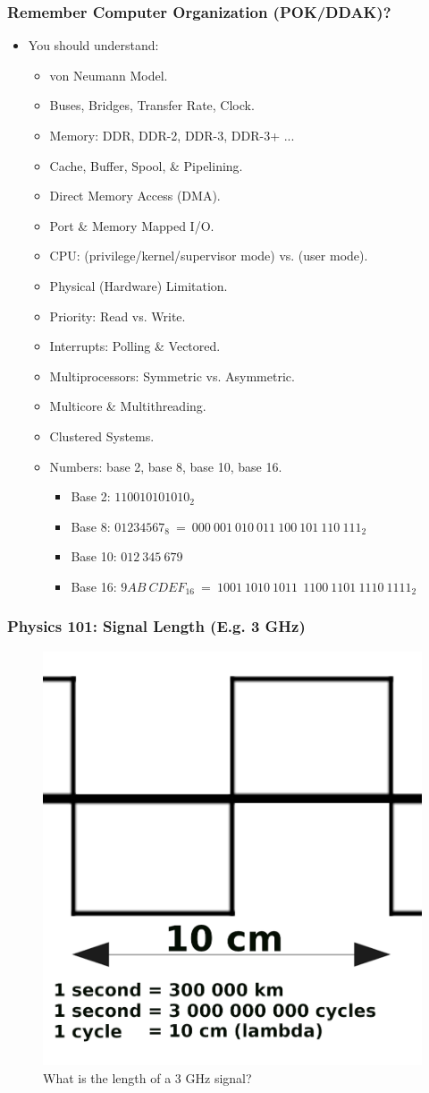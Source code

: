 \documentclass[aspectratio=169, xcolor=table, notheorems, hyperref={pdfpagelabels=false}]{beamer}
\begin{document}
\begin{frame}
\frametitle{Remember Computer Organization (POK/DDAK)?}
\begin{itemize}
\item You should understand:
\begin{itemize}
\item von Neumann Model.
\item Buses, Bridges, Transfer Rate, Clock.
\item Memory: DDR, DDR-2, DDR-3, DDR-3+ ...
\item Cache, Buffer, Spool, \& Pipelining.
\item Direct Memory Access (DMA).
\item Port \& Memory Mapped I/O.
\item CPU: (privilege/kernel/supervisor mode) vs. (user mode).
\item Physical (Hardware) Limitation.
\item Priority: Read vs. Write.
\item Interrupts: Polling \& Vectored.
\item Multiprocessors: Symmetric vs. Asymmetric.
\item Multicore \& Multithreading.
\item Clustered Systems.
\item Numbers: base 2, base 8, base 10, base 16.
\begin{itemize}
\item Base 2: $110010101010_2$
\item Base 8: $01234567_8\ =\ 000\ 001\ 010\ 011\ 100\ 101\ 110\ 111_2$
\item Base 10: $012\ 345\ 679$
\item Base 16: $9AB\ CDEF_{16}\ =\ 1001\ 1010\ 1011\ \ 1100\ 1101\ 1110\ 1111_2$
\end{itemize}
\end{itemize}
\end{itemize}
\end{frame}

\begin{frame}
\frametitle{Physics 101: Signal Length (E.g. 3 GHz)}
\begin{figure}
\includegraphics[width=0.40\linewidth]{os-wave3}
\caption{What is the length of a 3 GHz signal?}
\end{figure}
\end{frame}
\end{document}

